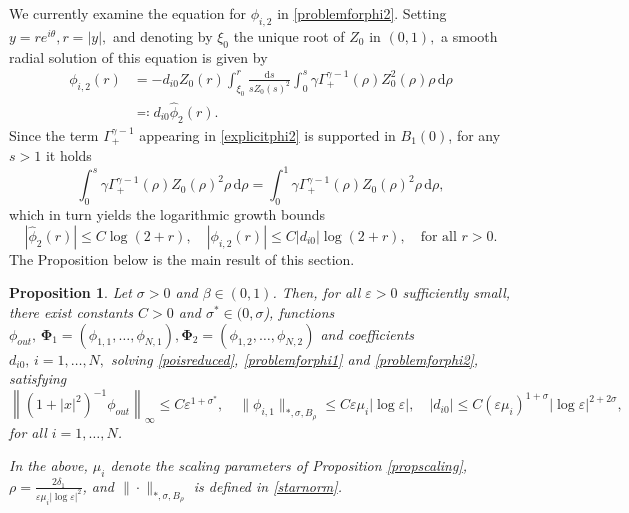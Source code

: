 \documentclass[11pt,reqno,a4paper]{amsart}
\numberwithin{equation}{section}
\def\dd{{\mathrm{d}}}
\newcommand{\ve}{\varepsilon}
\newtheorem{prop}{Proposition}[section]
\begin{document}
We currently examine the equation for $\phi_{i,2}$ in \eqref{problemforphi2}. Setting $y=re^{i\theta}, r=|y|,$ and denoting by $\xi_0$ the unique root of $Z_0$ in $(0,1),$ a smooth radial solution of this equation is given by
\begin{equation}\label{explicitphi2}
\begin{aligned}
\phi_{i,2}(r)&=-d_{i0} Z_0 (r) \int_{\xi_0}^{r}\frac{\dd s}{sZ_0(s)^2} \int_{0}^{s} \gamma\Gamma^{\gamma-1}_{+}(\rho) Z_{0}^2(\rho)\rho \, \dd \rho\\
&\eqcolon d_{i0}\hat{\phi}_{2}(r).
\end{aligned}
\end{equation}
Since the term
$\Gamma^{\gamma-1}_{+}$ appearing in \eqref{explicitphi2} is supported in $B_1(0)$, for any $s>1$ it holds \[\int_{0}^{s}\gamma\Gamma^{\gamma-1}_{+}(\rho)Z_0(\rho)^2\rho \, \dd \rho = \int_{0}^{1}\gamma\Gamma^{\gamma-1}_{+}(\rho)Z_0(\rho)^2\rho \, \dd \rho, \]
which in turn yields the logarithmic growth bounds 
\begin{equation}\label{estimateforphi2}
|\hat{\phi}_{2}(r)|\leq C \log(2+r), \quad |\phi_{i,2}(r)| \leq C|d_{i0}|\log(2+r), \quad \mbox{for all}\,\,r>0.
\end{equation}
 The Proposition below is the main result of this section.
\begin{prop}\label{propsec8}
Let $\sigma > 0$ and $\beta \in (0,1)$. Then, for all $\ve>0$ sufficiently small, there exist constants $C>0$ and $\sigma^{*}\in(0,\sigma$), functions $\phi_{out},\,\mathbf{\Phi}_1=\left(\phi_{1,1},\dots,\phi_{N,1}\right),\mathbf{\Phi}_2=\left(\phi_{1,2},\dots,\phi_{N,2}\right)$ and coefficients $d_{i0},\,i=1,\dots,N,$ solving \eqref{poisreduced}, \eqref{problemforphi1} and \eqref{problemforphi2}, satisfying
 \begin{equation}\label{boundsforsoln}
    \left\|(1+|x|^2)^{-1}\phi_{out}\right\|_{\infty}\leq C\ve^{1+\sigma^{*}}, \quad \|\phi_{i,1}\|_{*,\sigma,B_{\rho}}\leq C\ve\mu_i|\log\ve|, \quad |d_{i0}|\leq C (\ve\mu_i)^{1+\sigma}|\log\ve|^{2+2\sigma},
 \end{equation}
 for all $i=1,\dots,N$.
 
 In the above, $\mu_i$ denote the scaling parameters of Proposition \ref{propscaling}, \,$\rho=\frac{2\delta_1}{\ve\mu_i|\log\ve|^2}$, and $\|\cdot\|_{*,\sigma,B_{\rho}}$ is defined in \eqref{starnorm}.
\end{prop}
\end{document}
